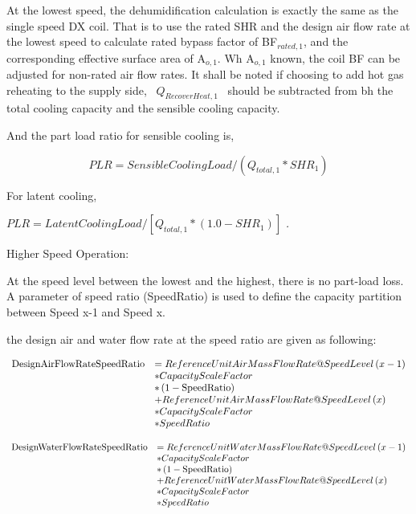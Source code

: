At the lowest speed, the dehumidification calculation is exactly the same as the single speed DX coil. That is to use the rated SHR and the design air flow rate at the lowest speed to calculate rated bypass factor of BF\(_{rated,1}\), and the corresponding effective surface area of A\(_{o,1}\). Wh A\(_{o,1}\) known, the coil BF can be adjusted for non-rated air flow rates. It shall be noted if choosing to add hot gas reheating to the supply side,~ \({Q_{RecoverHeat,1}}\) ~should be subtracted from bh the total cooling capacity and the sensible cooling capacity.

And the part load ratio for sensible cooling is,

\begin{equation}
PLR = SensibleCoolingLoad/({Q_{total,1}}*SH{R_1})
\end{equation}

For latent cooling,

\(PLR = LatentCoolingLoad/[{Q_{total,1}}*(1.0 - SH{R_1})]\) \emph{.}

Higher Speed Operation:

At the speed level between the lowest and the highest, there is no part-load loss. A parameter of speed ratio (SpeedRatio) is used to define the capacity partition between Speed x-1 and Speed x.

the design air and water flow rate at the speed ratio are given as following:

\begin{equation}
  \begin{array}{rl}
    {\rm{DesignAirFlowRateSpeedRatio}} &= ReferenceUnitAirMassFlowRate@SpeedLevel\left( {x - 1} \right) \\
                                       &* CapacityScaleFactor \\
                                       &* \left( {1-\rm{SpeedRatio}} \right) \\
                                       &+ ReferenceUnitAirMassFlowRate@SpeedLevel\left( x \right) \\
                                       &* CapacityScaleFactor \\
                                       &* SpeedRatio
  \end{array}
\end{equation}

\begin{equation}
  \begin{array}{rl}
    \rm{DesignWaterFlowRateSpeedRatio} &= ReferenceUnitWaterMassFlowRate@SpeedLevel\left( {x - 1} \right) \\
                                        &* CapacityScaleFactor \\
                                        &* \left( {1-\rm{SpeedRatio}} \right) \\
                                        &+ ReferenceUnitWaterMassFlowRate@SpeedLevel\left( x \right) \\
                                        &* CapacityScaleFactor \\
                                        &* SpeedRatio
  \end{array}
\end{equation}

